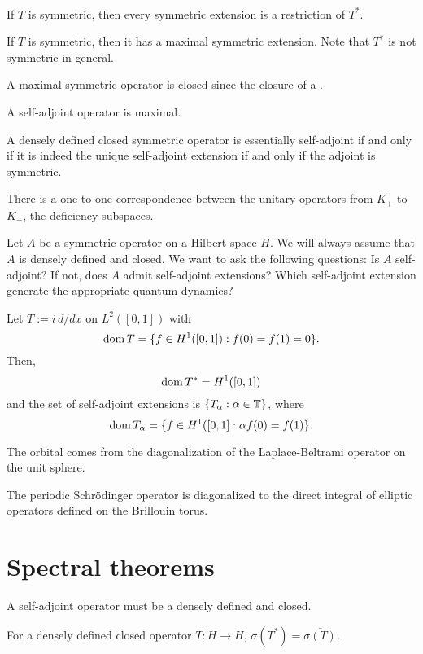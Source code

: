 \documentclass{../../large}
\begin{document}
\begin{prb}
\,
\begin{parts}
\item If $T$ is symmetric, then every symmetric extension is a restriction of $T^*$.
\item If $T$ is symmetric, then it has a maximal symmetric extension. Note that $T^*$ is not symmetric in general.
\item A maximal symmetric operator is closed since the closure of a .
\item A self-adjoint operator is maximal.
\item A densely defined closed symmetric operator is essentially self-adjoint if and only if it is indeed the unique self-adjoint extension if and only if the adjoint is symmetric.
\end{parts}
\end{prb}

\begin{prb}
\end{prb}

There is a one-to-one correspondence between the unitary operators from $K_+$ to $K_-$, the deficiency subspaces.

Let $A$ be a symmetric operator on a Hilbert space $H$.
We will always assume that $A$ is densely defined and closed.
We want to ask the following questions:
Is $A$ self-adjoint?
If not, does $A$ admit self-adjoint extensions?
Which self-adjoint extension generate the appropriate quantum dynamics?

Let $T:=i\,d/dx$ on $L^2([0,1])$ with
\[\operatorname{dom} T=\{f\in H^1([0,1]):f(0)=f(1)=0\}.\]
Then,
\[\operatorname{dom} T^*=H^1([0,1])\]
and the set of self-adjoint extensions is $\{T_\alpha:\alpha\in\mathbb{T}\}$, where
\[\operatorname{dom} T_\alpha=\{f\in H^1([0,1]:\alpha f(0)=f(1)\}.\]

The orbital comes from the diagonalization of the Laplace-Beltrami operator on the unit sphere.

The periodic Schr\"odinger operator is diagonalized to the direct integral of elliptic operators defined on the Brillouin torus.


\section{Spectral theorems}

A self-adjoint operator must be a densely defined and closed.

\begin{prb}
For a densely defined closed operator $T:H\to H$, $\sigma(T^*)=\bar{\sigma(T)}$.
\end{prb}
\end{document}
